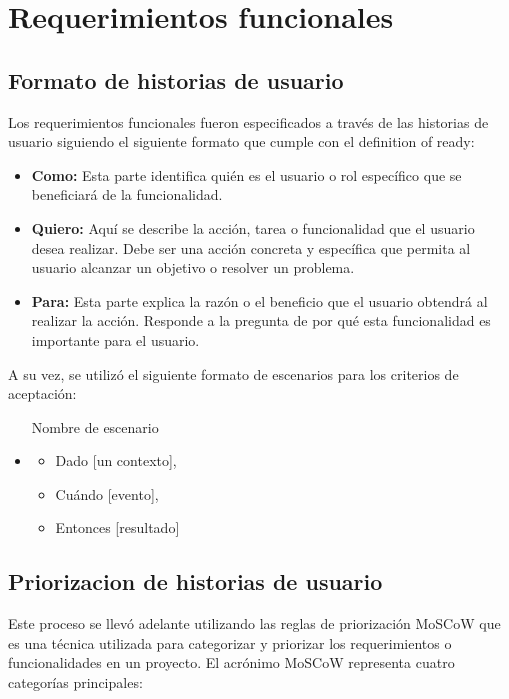 \section{Requerimientos funcionales}\label{sec:requerimientosFuncionales}

\subsection{Formato de historias de usuario}
Los requerimientos funcionales fueron especificados a través de las historias de usuario siguiendo el siguiente formato que cumple con el definition of ready:

\begin{itemize}
    \item \textbf{Como:} Esta parte identifica quién es el usuario o rol específico que se beneficiará de la funcionalidad.
    \item \textbf{Quiero:} Aquí se describe la acción, tarea o funcionalidad que el usuario desea realizar. Debe ser una acción concreta y específica que permita 
    al usuario alcanzar un objetivo o resolver un problema.
    \item \textbf{Para:} Esta parte explica la razón o el beneficio que el usuario obtendrá al realizar la acción. Responde a la pregunta de por qué esta funcionalidad es 
    importante para el usuario.
\end{itemize}

A su vez, se utilizó el siguiente formato de escenarios para los criterios de aceptación:

\begin{itemize}
    \item [Nombre de escenario]
    \item \begin{itemize}
        \item Dado [un contexto],
        \item Cuándo [evento],
        \item Entonces [resultado]
    \end{itemize}
\end{itemize}


\subsection{Priorizacion de historias de usuario}

Este proceso se llevó adelante utilizando las reglas de priorización MoSCoW que es una técnica utilizada para categorizar y priorizar los requerimientos o funcionalidades en un proyecto. El acrónimo 
MoSCoW representa cuatro categorías principales:

